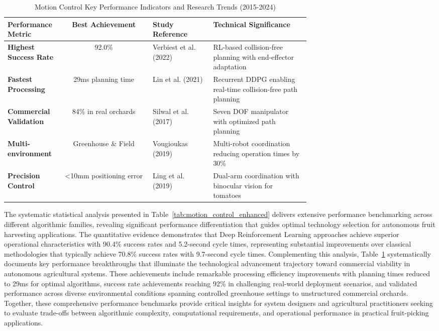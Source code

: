 \documentclass{ieeeaccess}
\begin{document}
\begin{table}[htbp]
\centering
\footnotesize
\renewcommand{\arraystretch}{1.2}
\caption{Motion Control Key Performance Indicators and Research Trends (2015-2024)}
\label{tab:motion_control_kpis}
\begin{tabularx}{\textwidth}{>{\raggedright\arraybackslash}m{0.18\linewidth}c>{\raggedright\arraybackslash}m{0.20\linewidth}>{\raggedright\arraybackslash}m{0.32\linewidth}}
\toprule
\textbf{Performance Metric} & \textbf{Best Achievement} & \textbf{Study Reference} & \textbf{Technical Significance} \\
\midrule
\textbf{Highest Success Rate} & 92.0\% & Verbiest et al. (2022) & RL-based collision-free planning with end-effector adaptation \\
\midrule
\textbf{Fastest Processing} & 29ms planning time & Lin et al. (2021) & Recurrent DDPG enabling real-time collision-free path planning \\
\midrule
\textbf{Commercial Validation} & 84\% in real orchards & Silwal et al. (2017) & Seven DOF manipulator with optimized path planning \\
\midrule
\textbf{Multi-environment} & Greenhouse \& Field & Vougioukas (2019) & Multi-robot coordination reducing operation times by 30\% \\
\midrule
\textbf{Precision Control} & <10mm positioning error & Ling et al. (2019) & Dual-arm coordination with binocular vision for tomatoes \\
\bottomrule
\end{tabularx}
\end{table}
\fi
The systematic statistical analysis presented in Table~\ref{tab:motion_control_enhanced} delivers extensive performance benchmarking across different algorithmic families, revealing significant performance differentiation that guides optimal technology selection for autonomous fruit harvesting applications. The quantitative evidence demonstrates that Deep Reinforcement Learning approaches achieve superior operational characteristics with 90.4\% success rates and 5.2-second cycle times, representing substantial improvements over classical methodologies that typically achieve 70.8\% success rates with 9.7-second cycle times. Complementing this analysis, Table~\ref{tab:motion_control_kpis} systematically documents key performance breakthroughs that illuminate the technological advancement trajectory toward commercial viability in autonomous agricultural systems. These achievements include remarkable processing efficiency improvements with planning times reduced to 29ms for optimal algorithms, success rate achievements reaching 92\% in challenging real-world deployment scenarios, and validated performance across diverse environmental conditions spanning controlled greenhouse settings to unstructured commercial orchards. Together, these comprehensive performance benchmarks provide critical insights for system designers and agricultural practitioners seeking to evaluate trade-offs between algorithmic complexity, computational requirements, and operational performance in practical fruit-picking applications.
\end{document}
